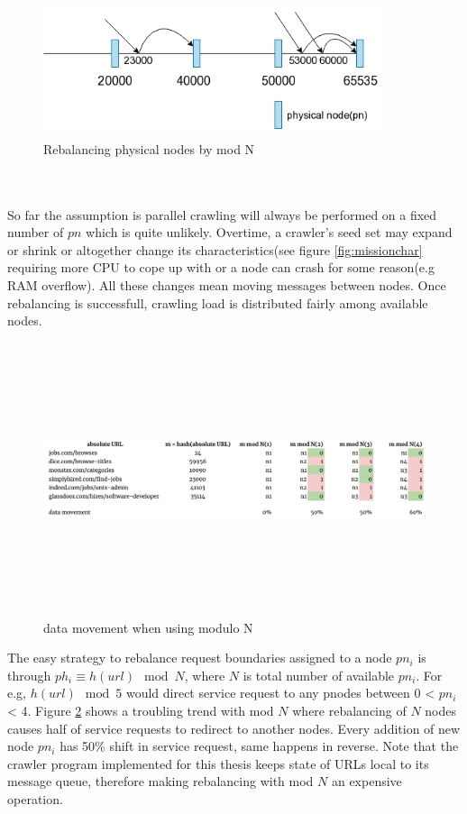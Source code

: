 \begin{figure}[h!]
  \centering
  \includegraphics[width=10cm,height=4cm,keepaspectratio]{../media/crawler/modnsplit.png}
  \caption{Rebalancing physical nodes by mod N}
  \label{fig:modnsplit}
\end{figure}
\\
\\
\noindent
So far the assumption is parallel crawling will always be performed on a fixed number of $pn$ which is quite
unlikely. Overtime, a crawler's seed set may expand or shrink or altogether change its characteristics(see
figure \ref{fig:missionchar} requiring more CPU to cope up with or a node can crash for some
reason(e.g RAM overflow). All these changes mean moving messages between nodes. Once rebalancing is successfull, crawling load is distributed fairly among available nodes.
\begin{figure}[h!]
  \centering
  \includegraphics[width=16cm,height=8cm,keepaspectratio]{../media/crawler/modn_info.png}
  \caption{data movement when using modulo N}
  \label{fig:movemodn}
\end{figure}

\noindent
The easy strategy to rebalance request boundaries assigned to a node $pn_i$ is through $ph_i \equiv h(url)\mod{N}$, where $N$ is total number of available $pn_i$. For e.g, $h(url)\mod 5$ would direct service request
to any pnodes between 0 < $pn_i$ < 4. Figure \ref{fig:movemodn} shows a troubling trend with mod $N$ where
rebalancing of $N$ nodes causes half of service requests to redirect to another nodes. Every addition of
new node $pn_i$ has 50\% shift in service request, same happens in reverse. Note that the crawler program implemented for this thesis keeps state of URLs local to its message queue, therefore making rebalancing
with mod $N$ an expensive operation.


